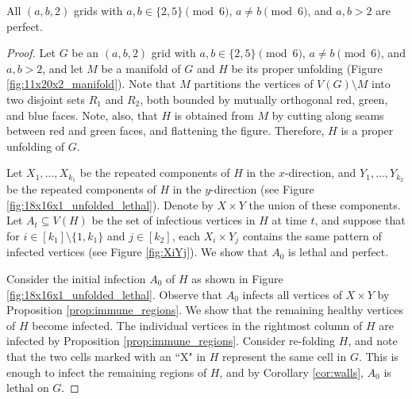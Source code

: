 
\begin{con}
All $(a,b,2)$ grids with $a,b \in \{2,5\} \pmod 6$, $a \neq b \pmod 6$, and $a,b > 2$ are perfect. 
\end{con}

\begin{proof}
Let $G$ be an $(a,b,2)$ grid with $a,b \in \{2,5\} \pmod 6$, $a \neq b \pmod 6$, and $a,b > 2$, and let $M$ be a manifold of $G$ and $H$ be its proper unfolding (Figure \ref{fig:11x20x2_manifold}). Note that $M$ partitions the vertices of $V(G) \setminus M$ into two disjoint sets $R_1$ and $R_2$, both bounded by mutually orthogonal red, green, and blue faces. Note, also, that $H$ is obtained from $M$ by cutting along seams between red and green faces, and flattening the figure. Therefore, $H$ is a proper unfolding of $G$. 

Let $X_1, \dots, X_{k_1}$ be the repeated components of $H$ in the $x$-direction, and $Y_1, \dots, Y_{k_2}$ be the repeated components of $H$ in the $y$-direction (see Figure \ref{fig:18x16x1_unfolded_lethal}). Denote by $X \times Y$ the union of these components. Let $A_t \subseteq V(H)$ be the set of infectious vertices in $H$ at time $t$, and suppose that for $i \in [k_1] \setminus \{1,k_1\}$ and $j \in [k_2]$, each $X_i \times Y_j$ contains the same pattern of infected vertices (see Figure \ref{fig:XiYj}). We show that $A_0$ is lethal and perfect.

Consider the initial infection $A_0$ of $H$ as shown in Figure \ref{fig:18x16x1_unfolded_lethal}. Observe that $A_0$ infects all vertices of $X\times Y$ by Proposition \ref{prop:immune_regions}. We show that the remaining healthy vertices of $H$ become infected. The individual vertices in the rightmost column of $H$ are infected by Proposition \ref{prop:immune_regions}. Consider re-folding $H$, and note that the two cells marked with an ``X" in $H$ represent the same cell in $G$. This is enough to infect the remaining regions of $H$, and by Corollary \ref{cor:walls}, $A_0$ is lethal on $G$. 


\end{proof}
